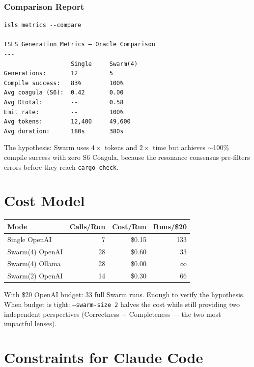 \documentclass[11pt,a4paper]{article}
\begin{document}
\subsubsection{Comparison Report}

\begin{lstlisting}[style=bash]
isls metrics --compare

ISLS Generation Metrics — Oracle Comparison
---
                   Single     Swarm(4)
Generations:       12         5
Compile success:   83%        100%
Avg coagula (S6):  0.42       0.00
Avg Dtotal:        --         0.58
Emit rate:         --         100%
Avg tokens:        12,400     49,600
Avg duration:      180s       380s
\end{lstlisting}

The hypothesis: Swarm uses $4\times$ tokens and $2\times$ time but 
achieves $\sim$100\% compile success with zero S6 Coagula, because 
the resonance consensus pre-filters errors before they reach 
\texttt{cargo check}.


\section{Cost Model}

\begin{longtable}{lrrr}
\toprule
\textbf{Mode} & \textbf{Calls/Run} & \textbf{Cost/Run} & \textbf{Runs/\$20} \\
\midrule
Single OpenAI    & 7    & \$0.15  & 133 \\
Swarm(4) OpenAI  & 28   & \$0.60  & 33 \\
Swarm(4) Ollama  & 28   & \$0.00  & $\infty$ \\
Swarm(2) OpenAI  & 14   & \$0.30  & 66 \\
\bottomrule
\end{longtable}

With \$20 OpenAI budget: 33 full Swarm runs. Enough to verify 
the hypothesis. When budget is tight: \texttt{--swarm-size 2} 
halves the cost while still providing two independent perspectives 
(Correctness + Completeness --- the two most impactful lenses).


\section{Constraints for Claude Code}
\end{document}
